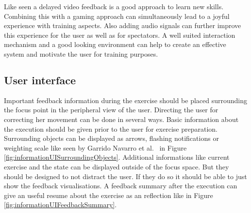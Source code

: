 Like seen a delayed video feedback is a good approach to learn new skills. Combining this with a gaming approach can simultaneously lead to a joyful experience with training aspects. Also adding audio signals can further improve this experience for the user as well as for spectators. A well suited interaction mechanism and a good looking environment can help to create an effective system and motivate the user for training purposes.

\subsection{User interface}

Important feedback information during the exercise should be placed surrounding the focus point in the peripheral view of the user. Directing the user for correcting her movement can be done in several ways. Basic information about the execution should be given prior to the user for exercise preparation. Surrounding objects can be displayed as arrows, flashing notifications or weighting scale like seen by Garrido Navarro et al.~\cite{Garrido2013-zs} in Figure \ref{fig:informationUISurroundingObjects}. Additional informations like current exercise and the state can be displayed outside of the focus space. But they should be designed to not distract the user. If they do so it should be able to just show the feedback visualisations. A feedback summary after the execution can give an useful resume about the exercise as an reflection like in Figure \ref{fig:informationUIFeedbackSummary}.
